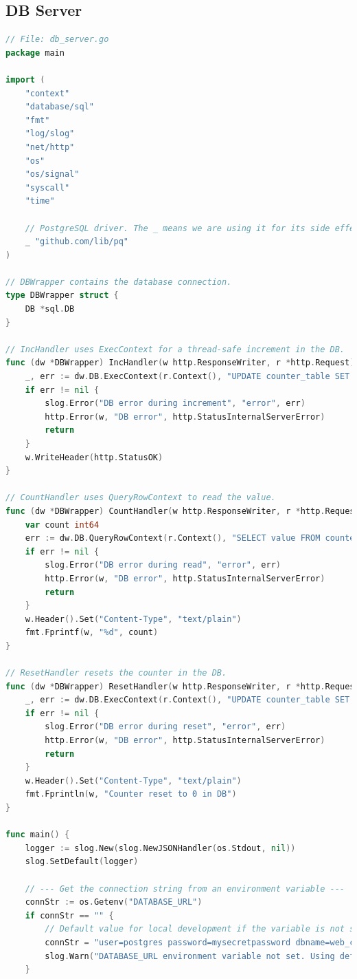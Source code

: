 \documentclass[12pt,a4paper]{article}
\begin{document}
\subsection{DB Server}
\begin{lstlisting}[language=Go]
    // File: db_server.go
package main

import (
	"context"
	"database/sql"
	"fmt"
	"log/slog"
	"net/http"
	"os"
	"os/signal"
	"syscall"
	"time"

	// PostgreSQL driver. The _ means we are using it for its side effects (driver registration).
	_ "github.com/lib/pq"
)

// DBWrapper contains the database connection.
type DBWrapper struct {
	DB *sql.DB
}

// IncHandler uses ExecContext for a thread-safe increment in the DB.
func (dw *DBWrapper) IncHandler(w http.ResponseWriter, r *http.Request) {
	_, err := dw.DB.ExecContext(r.Context(), "UPDATE counter_table SET value = value + 1 WHERE id = 1")
	if err != nil {
		slog.Error("DB error during increment", "error", err)
		http.Error(w, "DB error", http.StatusInternalServerError)
		return
	}
	w.WriteHeader(http.StatusOK)
}

// CountHandler uses QueryRowContext to read the value.
func (dw *DBWrapper) CountHandler(w http.ResponseWriter, r *http.Request) {
	var count int64
	err := dw.DB.QueryRowContext(r.Context(), "SELECT value FROM counter_table WHERE id = 1").Scan(&count)
	if err != nil {
		slog.Error("DB error during read", "error", err)
		http.Error(w, "DB error", http.StatusInternalServerError)
		return
	}
	w.Header().Set("Content-Type", "text/plain")
	fmt.Fprintf(w, "%d", count)
}

// ResetHandler resets the counter in the DB.
func (dw *DBWrapper) ResetHandler(w http.ResponseWriter, r *http.Request) {
	_, err := dw.DB.ExecContext(r.Context(), "UPDATE counter_table SET value = 0 WHERE id = 1")
	if err != nil {
		slog.Error("DB error during reset", "error", err)
		http.Error(w, "DB error", http.StatusInternalServerError)
		return
	}
	w.Header().Set("Content-Type", "text/plain")
	fmt.Fprintln(w, "Counter reset to 0 in DB")
}

func main() {
	logger := slog.New(slog.NewJSONHandler(os.Stdout, nil))
	slog.SetDefault(logger)

	// --- Get the connection string from an environment variable ---
	connStr := os.Getenv("DATABASE_URL")
	if connStr == "" {
		// Default value for local development if the variable is not set.
		connStr = "user=postgres password=mysecretpassword dbname=web_counter_db sslmode=disable"
		slog.Warn("DATABASE_URL environment variable not set. Using default value.")
	}


\end{lstlisting}
\end{document}
